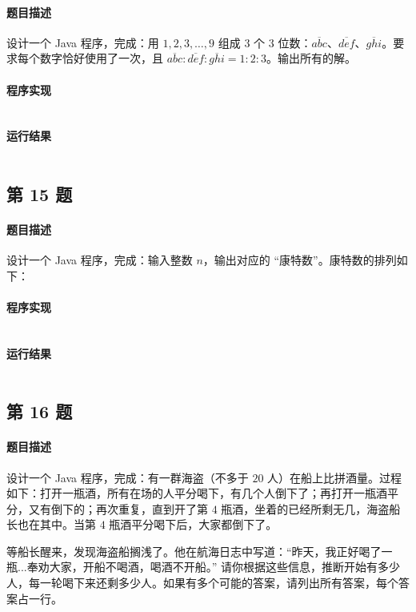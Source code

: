 \documentclass{academics}
\begin{document}
\paragraph{题目描述} {
    设计一个 Java 程序，完成：用 $1,2,3,\dots,9$ 组成 $3$ 个 $3$ 位数：$\overline{abc}$、$\overline{def}$、$\overline{ghi}$。要求每个数字恰好使用了一次，且 $\overline{abc}:\overline{def}:\overline{ghi}=1:2:3$。输出所有的解。
}

\paragraph{程序实现} {
    \inputminted[label=Solution.java]{java}{../src/P14/Solution.java}
}

\paragraph{运行结果} {
    \inputminted{text}{../res/P14.out}
}

\subsection{第 15 题}

\paragraph{题目描述} {
    设计一个 Java 程序，完成：输入整数 $n$，输出对应的 ``康特数''。康特数的排列如下：
    \begin{figure}[h]
        \centering
    \end{figure}
}

\paragraph{程序实现} {
    \inputminted[label=Solution.java]{java}{../src/P15/Solution.java}
}

\paragraph{运行结果} {
    \inputminted{text}{../res/P15.out}
}

\subsection{第 16 题}

\paragraph{题目描述} {
    设计一个 Java 程序，完成：有一群海盗（不多于 $20$ 人）在船上比拼酒量。过程如下：打开一瓶酒，所有在场的人平分喝下，有几个人倒下了；再打开一瓶酒平分，又有倒下的；再次重复，直到开了第 $4$ 瓶酒，坐着的已经所剩无几，海盗船长也在其中。当第 $4$ 瓶酒平分喝下后，大家都倒下了。

    等船长醒来，发现海盗船搁浅了。他在航海日志中写道：``昨天，我正好喝了一瓶...奉劝大家，开船不喝酒，喝酒不开船。'' 请你根据这些信息，推断开始有多少人，每一轮喝下来还剩多少人。如果有多个可能的答案，请列出所有答案，每个答案占一行。
}
\end{document}
